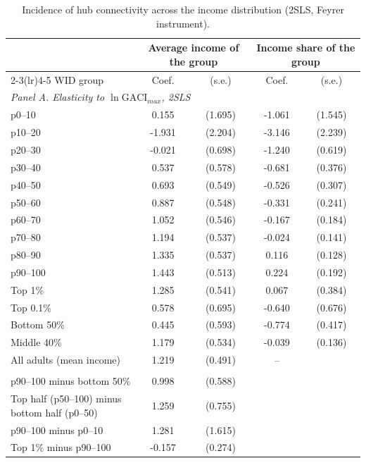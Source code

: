\begin{table}[H]
\centering
\caption{Incidence of hub connectivity across the income distribution (2SLS, Feyrer instrument).}
\label{tab:incidence}
\begin{threeparttable}
\small
\begin{tabular}{lcccc}
\toprule
 & \multicolumn{2}{c}{Average income of the group} & \multicolumn{2}{c}{Income share of the group} \\
\cmidrule(lr){2-3}\cmidrule(lr){4-5}
WID group & Coef. & (s.e.) & Coef. & (s.e.) \\
\midrule
\multicolumn{5}{l}{\emph{Panel A. Elasticity to $\ln\mathrm{GACI}_{max}$, 2SLS}}\\
p0--10 & 0.155 & (1.695) & -1.061 & (1.545) \\
p10--20 & -1.931 & (2.204) & -3.146 & (2.239) \\
p20--30 & -0.021 & (0.698) & -1.240\sym{**} & (0.619) \\
p30--40 & 0.537 & (0.578) & -0.681\sym{*} & (0.376) \\
p40--50 & 0.693 & (0.549) & -0.526\sym{*} & (0.307) \\
p50--60 & 0.887 & (0.548) & -0.331 & (0.241) \\
p60--70 & 1.052\sym{*} & (0.546) & -0.167 & (0.184) \\
p70--80 & 1.194\sym{**} & (0.537) & -0.024 & (0.141) \\
p80--90 & 1.335\sym{**} & (0.537) & 0.116 & (0.128) \\
p90--100 & 1.443\sym{***} & (0.513) & 0.224 & (0.192) \\
Top 1\% & 1.285\sym{**} & (0.541) & 0.067 & (0.384) \\
Top 0.1\% & 0.578 & (0.695) & -0.640 & (0.676) \\
Bottom 50\% & 0.445 & (0.593) & -0.774\sym{*} & (0.417) \\
Middle 40\% & 1.179\sym{**} & (0.534) & -0.039 & (0.136) \\
All adults (mean income) & 1.219\sym{**} & (0.491) & -- &  \\
\addlinespace
\multicolumn{5}{l}{\emph{Panel B. Differences between groups (difference outcomes)}}\\
p90--100 minus bottom 50\% & 0.998\sym{*} & (0.588) & & \\
Top half (p50--100) minus bottom half (p0--50) & 1.259\sym{*} & (0.755) & & \\
p90--100 minus p0--10 & 1.281 & (1.615) & & \\
Top 1\% minus p90--100 & -0.157 & (0.274) & & \\

\end{tabular}
\end{threeparttable}
\end{table}
